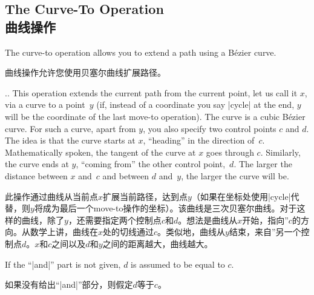 \subsection{The Curve-To Operation\\曲线操作}

The curve-to operation allows you to extend a path using a Bézier curve.

曲线操作允许您使用贝塞尔曲线扩展路径。


\begin{pathoperation}{..}{}
    This operation extends the current path from the current point, let us call
    it $x$, via a curve to a point~$y$ (if, instead of a coordinate you say
    |cycle| at the end, $y$ will be the coordinate of the last move-to
    operation). The curve is a cubic Bézier curve. For such a curve, apart
    from $y$, you also specify two control points $c$ and $d$. The idea is that
    the curve starts at $x$, ``heading'' in the direction of~$c$.
    Mathematically spoken, the tangent of the curve at $x$ goes through $c$.
    Similarly, the curve ends at $y$, ``coming from'' the other control
    point,~$d$. The larger the distance between $x$ and~$c$ and between $d$
    and~$y$, the larger the curve will be.

    此操作通过曲线从当前点$x$扩展当前路径，达到点$y$（如果在坐标处使用|cycle|代替，则$y$将成为最后一个move-to操作的坐标）。该曲线是三次贝塞尔曲线。对于这样的曲线，除了$y$，还需要指定两个控制点$c$和$d$。想法是曲线从$x$开始，指向''$c$的方向。从数学上讲，曲线在$x$处的切线通过$c$。类似地，曲线从$y$结束，来自''另一个控制点$d$。$x$和$c$之间以及$d$和$y$之间的距离越大，曲线越大。



    If the ``|and|'' part is not given, $d$ is assumed to be equal to
    $c$.

    如果没有给出``|and|''部分，则假定$d$等于$c$。

\begin{codeexample}[]
\end{codeexample}

\begin{codeexample}[]
\end{codeexample}


\end{pathoperation}
